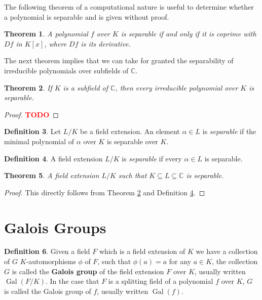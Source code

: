 \documentclass[12pt]{article}
\newtheorem{theorem}{Theorem}
\theoremstyle{definition}
\newtheorem{definition}[theorem]{Definition}
\newcommand{\Gal}{\operatorname{Gal}}
\newcommand{\C}{\mathbb C}
\newcommand{\TODO}{\textbf{\textcolor{red}{TODO}}}
\begin{document}
The following theorem of a computational nature is useful to determine whether a polynomial is separable and is given without proof. 

\begin{theorem} \label{thm:separable-derivative}
    A polynomial $f$ over $K$ is separable if and only if it is coprime with $Df$ in $K[x]$, where $Df$ is its derivative. 
\end{theorem}

The next theorem implies that we can take for granted the separability of irreducible polynomials over subfields of $\C$. 

\begin{theorem} \label{thm:separable-poly-in-C}
    If $K$ is a subfield of $\C$, then every irreducible polynomial over $K$ is separable. 
\end{theorem}

\begin{proof}
    \TODO
\end{proof}

\begin{definition}
    Let $L/K$ be a field extension. An element $\alpha \in L$ is \textit{separable} if the minimal polynomial of $\alpha$ over $K$ is separable over $K$.
\end{definition}

\begin{definition} \label{def:separable-extension}
    A field extension $L / K$ is \textit{separable} if every $\alpha \in L$ is separable.
\end{definition}

\begin{theorem}
    A field extension $L/K$ such that $K \subseteq L \subseteq \mathbb C$ is separable. 
\end{theorem}

\begin{proof}
    This directly follows from Theorem \ref{thm:separable-poly-in-C} and Definition \ref{def:separable-extension}. 
\end{proof}

\section{Galois Groups}
\begin{definition}
    Given a field $F$ which is a field extension of $K$ we have a collection of \(G\) \(K\)-automorphisms $\phi$ of $F$, such that $\phi(a) = a $ for any $ a \in K$, the collection \(G\) is called the \textbf{Galois group} of the field extension \(F\) over \(K\), usually written \(\Gal(F/K)\). In the case that \(F\) is a splitting field of a polynomial \(f\) over $K$, \(G\) is called the Galois group of \(f\), usually written \(\Gal(f)\).
\end{definition}
\end{document}
